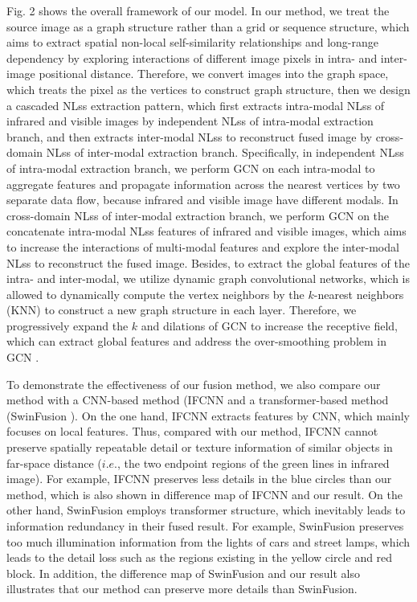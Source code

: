 \documentclass[journal]{IEEEtran}
\begin{document}
Fig. 2 shows the overall framework of our model. In our method, we treat the source image as a graph structure rather than a grid or sequence structure, which aims to extract spatial non-local self-similarity relationships and long-range dependency by exploring interactions of different image pixels in intra- and inter-image positional distance. Therefore, we convert images into the graph space, which treats the pixel as the vertices to construct graph structure, then we design a cascaded NLss extraction pattern, which first extracts intra-modal NLss of infrared and visible images by independent NLss of intra-modal extraction branch, and then extracts inter-modal NLss to reconstruct fused image by cross-domain NLss of inter-modal extraction branch. Specifically, in independent NLss of intra-modal extraction branch, we perform GCN on each intra-modal to aggregate features and propagate information across the nearest vertices by two separate data flow, because infrared and visible image have different modals. In cross-domain NLss of inter-modal extraction branch, we perform GCN on the concatenate intra-modal NLss features of infrared and visible images, which aims to increase the interactions of multi-modal features and explore the inter-modal NLss to reconstruct the fused image. Besides, to extract the global features of the intra- and inter-modal, we utilize dynamic graph convolutional networks, which is allowed to dynamically compute the vertex neighbors by the $k$-nearest neighbors (KNN) to construct a new graph structure in each layer. Therefore, we progressively expand the $k$ and dilations of GCN to increase the receptive field, which can extract global features and address the over-smoothing problem in GCN \cite{simonovsky2017dynamic, valsesia2018learning}.

To demonstrate the effectiveness of our fusion method, we also compare our method with a CNN-based method (IFCNN \cite{ zhang2020ifcnn } and a transformer-based method (SwinFusion \cite{ma2022swinfusion}). On the one hand, IFCNN extracts features by CNN, which mainly focuses on local features. Thus, compared with our method, IFCNN cannot preserve spatially repeatable detail or texture information of similar objects in far-space distance ($i.e.$, the two endpoint regions of the green lines in infrared image). For example, IFCNN preserves less details in the blue circles than our method, which is also shown in difference map of IFCNN and our result. On the other hand, SwinFusion employs transformer structure, which inevitably leads to information redundancy in their fused result. For example, SwinFusion preserves too much illumination information from the lights of cars and street lamps, which leads to the detail loss such as the regions existing in the yellow circle and red block. In addition, the difference map of SwinFusion and our result also illustrates that our method can preserve more details than SwinFusion.
\end{document}
